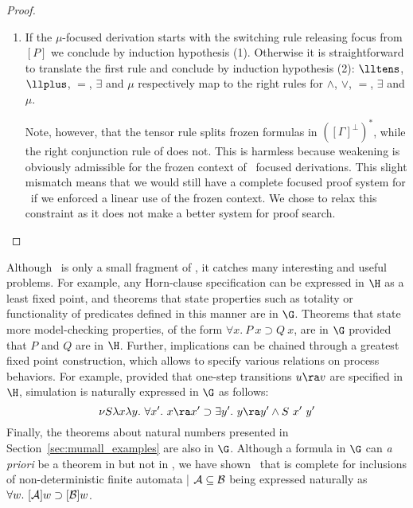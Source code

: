 \begin{proof}
\begin{enumerate}
\item
  If the $\mu$-focused derivation starts with the switching rule releasing
  focus from $[P]$ we conclude by induction hypothesis (1).
  Otherwise it is straightforward to translate the first rule and
  conclude by induction hypothesis (2):
  $\lltens$, $\llplus$, ${=}$, $\exists$ and $\mu$
  respectively map to the right rules for
  $\wedge$, $\vee$, ${=}$, $\exists$ and $\mu$.

  Note, however, that the tensor rule splits frozen formulas
  in $([\Gamma]^\perp)^*$, while the right conjunction rule of \muLJL{}
  does not. This is harmless because weakening is obviously admissible
  for the frozen context of \muLJL\ focused derivations.
  This slight mismatch means that we would still have a complete
  focused proof system for \muLJL\ if we enforced a linear use of
  the frozen context. We chose to relax this constraint as it does not
  make a better system for proof search.
\end{enumerate}
\vspace{-0.5cm}\end{proof}

Although \muLJL\ is only a small fragment of \muLJ,
it catches many interesting and useful problems.  For example, 
any Horn-clause specification can be expressed in $\H$ as a least
fixed point, and theorems that state properties such as totality or
functionality of predicates defined in this manner are in $\G$.
Theorems that state more model-checking properties, of the form
$\forall x.~ P~x\supset Q~x$, are in $\G$ provided
that $P$ and $Q$ are in $\H$.
Further, implications can be chained through a greatest fixed point
construction, which allows to specify various relations on
process behaviors.
For example, provided that one-step transitions $u\ra v$ are specified
in $\H$, simulation is naturally expressed in $\G$ as follows:
\[ \nu S \lambda x \lambda y.~
     \forall x'.~ x \ra x' \supset \exists y'.~ y \ra y' \wedge S~x'~y' \]
Finally, the theorems about natural numbers presented in
Section~\ref{sec:mumall_examples} are also in $\G$.
Although a formula in $\G$ can \emph{a priori} be a theorem in \muLJ{}
but not in \muLJL,
we have shown~\cite{baelde09tableaux} that \muLJL{}
is complete for inclusions of non-deterministic finite automata |
${\cal A}\subseteq {\cal B}$ being expressed naturally as
$\forall w.~ [{\cal A}]w \supset [{\cal B}]w$.


